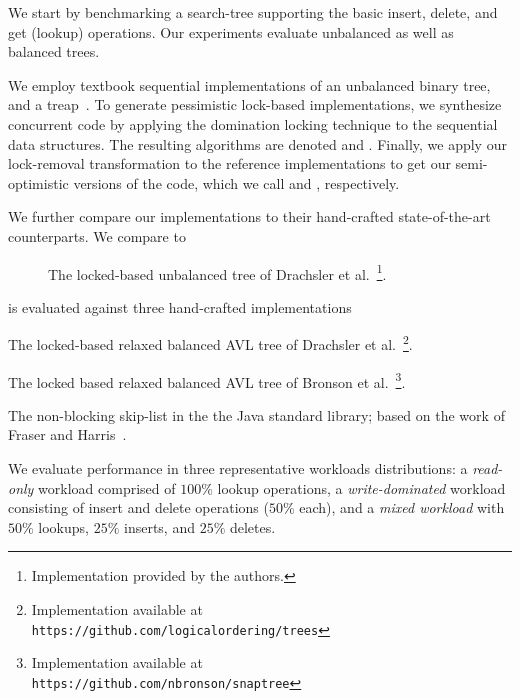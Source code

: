 We start by benchmarking a search-tree supporting the basic insert,
delete, and get (lookup) operations. Our experiments evaluate unbalanced as well
as balanced trees.

We employ textbook sequential implementations of an unbalanced binary
tree, and a treap~\cite{AragonS1989}. To
generate pessimistic lock-based implementations, we synthesize
concurrent code by applying the domination locking technique to the sequential
data structures. The resulting algorithms are denoted \domTree and \domTreap.
Finally, we apply our lock-removal transformation to the reference
implementations to get our semi-optimistic versions of the code, which we call
\autoTree and \autoTreap, respectively.

We further compare our implementations to their hand-crafted state-of-the-art counterparts. We compare \autoTree to
\begin{description}
\item[\danaTree] The locked-based
				unbalanced tree of Drachsler et
				al.~\cite{DrachslerVY2014}\footnote{Implementation provided by the authors.}.
\end{description}
\autoTreap is evaluated against three hand-crafted implementations
\begin{description}
\setlength{\itemsep}{0pt}
\setlength{\parskip}{0pt}
\item[\danaAVL] The locked-based relaxed balanced AVL tree of
				Drachsler et al.~\cite{DrachslerVY2014}\footnote{Implementation available at \\
				\texttt{https://github.com/logicalordering/trees}}.
\item[\bronson] The locked based relaxed balanced AVL tree
				of Bronson et al.~\cite{BronsonCCO2010}\footnote{Implementation available at \\
				\texttt{https://github.com/nbronson/snaptree}}.
\item[\skiplist] The non-blocking skip-list in the
				the Java standard library; based on the work of
				Fraser and Harris~\cite{fraser2004practical}.
\end{description}


We evaluate performance in three representative workloads distributions: a
\emph{read-only} workload comprised of $100\%$ lookup operations, a \emph{write-dominated}
workload consisting of insert and delete operations ($50\%$ each), and a
\emph{mixed workload} with $50\%$ lookups, $25\%$ inserts, and $25\%$
deletes.

